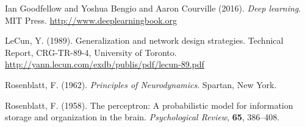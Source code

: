 \documentclass[12pt]{article}
\theoremstyle{plain}
\begin{document}
\begin{thebibliography}{Nature}
%

\hypertarget{Deeplea_Goodfellow}{}
Ian Goodfellow and Yoshua Bengio and Aaron Courville (2016). \textit{Deep learning}. MIT Press. \url{http://www.deeplearningbook.org}

\hypertarget{Deeplea_LeCun_1}{}
LeCun, Y. (1989). Generalization and network design strategies. Technical Report, CRG-TR-89-4, University of Toronto. \url{http://yann.lecun.com/exdb/publis/pdf/lecun-89.pdf}

\hypertarget{Deeplea_Rosenblatt_2}{}
Rosenblatt, F. (1962). \textit{Principles of Neurodynamics}. Spartan, New York.

\hypertarget{Deeplea_Rosenblatt_1}{}
Rosenblatt, F. (1958). The perceptron: A probabilistic model for information storage and organization in the brain. \textit{Psychological Review}, \textbf{65}, 386–408.
\end{thebibliography}
\end{document}

